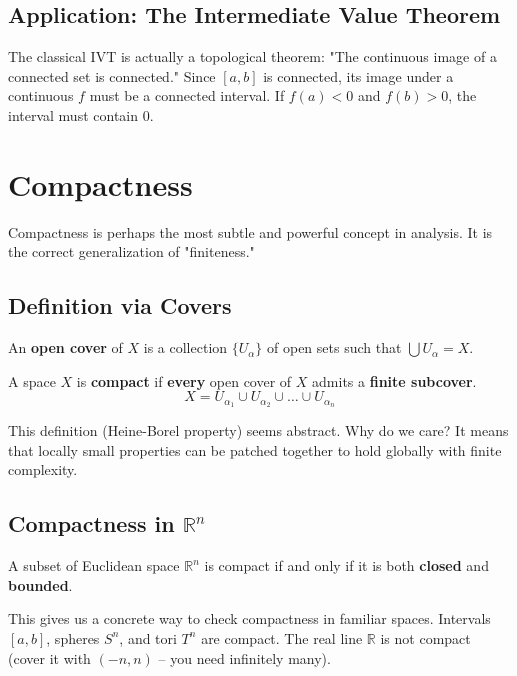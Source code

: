 \subsection{Application: The Intermediate Value Theorem}
The classical IVT is actually a topological theorem:
"The continuous image of a connected set is connected."
Since $[a, b]$ is connected, its image under a continuous $f$ must be a connected interval. If $f(a) < 0$ and $f(b) > 0$, the interval must contain 0.

\section{Compactness}

Compactness is perhaps the most subtle and powerful concept in analysis. It is the correct generalization of "finiteness."

\subsection{Definition via Covers}
\begin{definition}
An \textbf{open cover} of $X$ is a collection $\{U_\alpha\}$ of open sets such that $\bigcup U_\alpha = X$.
\end{definition}

\begin{definition}
A space $X$ is \textbf{compact} if \textbf{every} open cover of $X$ admits a \textbf{finite subcover}.
\[ X = U_{\alpha_1} \cup U_{\alpha_2} \cup \dots \cup U_{\alpha_n} \]
\end{definition}
This definition (Heine-Borel property) seems abstract. Why do we care?
It means that locally small properties can be patched together to hold globally with finite complexity.

\subsection{Compactness in $\mathbb{R}^n$}
\begin{theorem}
A subset of Euclidean space $\mathbb{R}^n$ is compact if and only if it is both \textbf{closed} and \textbf{bounded}.
\end{theorem}
This gives us a concrete way to check compactness in familiar spaces. Intervals $[a, b]$, spheres $S^n$, and tori $T^n$ are compact. The real line $\mathbb{R}$ is not compact (cover it with $(-n, n)$ -- you need infinitely many).

